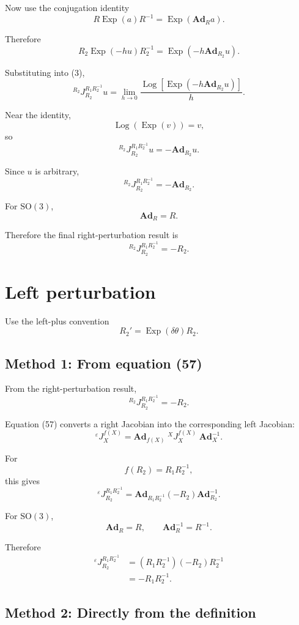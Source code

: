 \documentclass[11pt]{article}
\newcommand{\Exp}{\operatorname{Exp}}
\newcommand{\Log}{\operatorname{Log}}
\newcommand{\SO}{\mathrm{SO}}
\newcommand{\Ad}{\mathbf{Ad}}
\begin{document}
Now use the conjugation identity
\[
\boxed{
R\Exp(a)R^{-1}
=
\Exp(\Ad_R a).
}
\tag{4}
\]

Therefore
\[
R_2\Exp(-hu)R_2^{-1}
=
\Exp\!\left(-h\Ad_{R_2}u\right).
\]

Substituting into (3),
\[
{}^{R_2}J_{R_2}^{R_1R_2^{-1}}u
=
\lim_{h\to0}
\frac{
\Log\!\left[
\Exp(-h\Ad_{R_2}u)
\right]
}{h}.
\]

Near the identity,
\[
\Log(\Exp(v))=v,
\]
so
\[
{}^{R_2}J_{R_2}^{R_1R_2^{-1}}u
=
-\Ad_{R_2}u.
\]

Since $u$ is arbitrary,
\[
\boxed{
{}^{R_2}J_{R_2}^{R_1R_2^{-1}}
=
-\Ad_{R_2}.
}
\tag{5}
\]

For $\SO(3)$,
\[
\Ad_R=R.
\]

Therefore the final right-perturbation result is
\[
\boxed{
{}^{R_2}J_{R_2}^{R_1R_2^{-1}}
=
-R_2.
}
\tag{6}
\]


\section{Left perturbation}

Use the left-plus convention
\[
R_2'=\Exp(\delta\theta)R_2.
\]

\subsection{Method 1: From equation (57)}

From the right-perturbation result,
\[
\boxed{
{}^{R_2}J_{R_2}^{R_1R_2^{-1}}
=
-R_2.
}
\]

Equation (57) converts a right Jacobian into the corresponding left
Jacobian:
\[
\boxed{
{}^{\varepsilon}J_X^{f(X)}
=
\Ad_{f(X)}
\;{}^{X}J_X^{f(X)}
\;\Ad_X^{-1}.
}
\tag{57}
\]

For
\[
f(R_2)=R_1R_2^{-1},
\]
this gives
\[
{}^{\varepsilon}J_{R_2}^{R_1R_2^{-1}}
=
\Ad_{R_1R_2^{-1}}
\left(-R_2\right)
\Ad_{R_2}^{-1}.
\]

For $\SO(3)$,
\[
\Ad_R=R,
\qquad
\Ad_R^{-1}=R^{-1}.
\]

Therefore
\begin{align}
{}^{\varepsilon}J_{R_2}^{R_1R_2^{-1}}
&=
(R_1R_2^{-1})(-R_2)R_2^{-1}
\\
&=
\boxed{-R_1R_2^{-1}}.
\end{align}

\subsection{Method 2: Directly from the definition}
\end{document}
